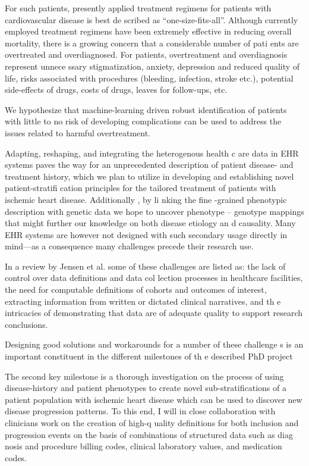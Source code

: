 For such patients, presently applied treatment
regimens for patients with cardiovascular disease is best de
scribed as “one-size-fits-all”. Although
currently employed treatment regimens have been
extremely effective in reducing overall mortality,
there is a growing concern that a considerable number of pati
ents are overtreated and overdiagnosed.
For patients, overtreatment and overdiagnosis represent unnece
ssary stigmatization, anxiety, depression and reduced quality of life,
risks associated with procedures (bleeding, infection, stroke etc.), 
potential side-effects of drugs, costs of drugs, leaves for follow-ups, etc. 

We hypothesize that machine-learning driven robust 
identification of patients with little to no risk of developing complications
can be used to address the issues related to harmful overtreatment. 

Adapting, reshaping, and integrating the heterogenous health c
are data in EHR systems paves the
way for an unprecedented description of patient disease- and
treatment history, which we plan to
utilize in developing and establishing novel patient-stratifi
cation principles for the tailored
treatment of patients with ischemic heart disease. Additionally
, by li
nking the
fine
-grained
phenotypic description with genetic data we hope to uncover
phenotype – genotype mappings
that might further our knowledge on both disease etiology an
d causality. Many EHR systems are
however not designed with such secondary usage directly
in mind—as a consequence many
challenges precede their research use. 

In a review by Jensen et al.
some of these challenges are
listed as: the lack of control over data definitions and data col
lection processes in healthcare
facilities, the need for computable definitions
of cohorts and outcomes of interest, extracting
information from written or dictated clinical narratives, and th
e intricacies of demonstrating that
data are of adequate quality to support research conclusions.

Designing good solutions and workarounds for a number of these challenge
s is an important constituent in the different milestones of th e described
PhD project


The
second
key milestone is a thorough investigation on the process
of using disease-history and
patient phenotypes to create
novel sub-stratifications of
a patient population with ischemic heart
disease which can be used to discover new disease 
progression patterns. 
To this end, I will in close
collaboration with clinicians work on the creation of high-q
uality definitions for both inclusion and
progression events on the basis of combinations of structured data such as diag
nosis and procedure billing codes, clinical laboratory values, and
medication codes.


